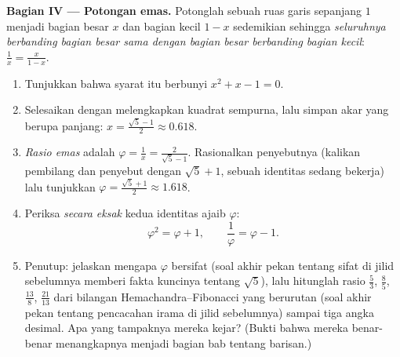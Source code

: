 \begin{problem}[{Soal akhir pekan --- soal jumlah-dan-hasil-kali,
melengkapkan kuadrat sempurna sebagaimana digambar al-Khwarizmi, dan
persamaan $x^2 = x + 1$}]
\medskip
\noindent\textbf{Bagian IV --- Potongan emas.}
Potonglah sebuah ruas garis sepanjang $1$ menjadi bagian besar $x$ dan
bagian kecil $1 - x$ sedemikian sehingga
\emph{seluruhnya berbanding bagian besar sama dengan bagian besar berbanding bagian kecil}:
$\frac{1}{x} = \frac{x}{1 - x}$.
\begin{enumerate}[resume]
  \item Tunjukkan bahwa syarat itu berbunyi $x^2 + x - 1 = 0$.
  \item Selesaikan dengan melengkapkan kuadrat sempurna, lalu simpan akar
        yang berupa panjang: $x = \frac{\sqrt5 - 1}{2} \approx 0.618$.
  \item \emph{Rasio emas} adalah
        $\varphi = \frac1x = \frac{2}{\sqrt5 - 1}$. Rasionalkan
        penyebutnya (kalikan pembilang dan penyebut dengan
        $\sqrt5 + 1$, sebuah identitas sedang bekerja) lalu tunjukkan
        $\varphi = \frac{\sqrt5 + 1}{2} \approx 1.618$.
  \item Periksa \emph{secara eksak} kedua identitas ajaib
        $\varphi$:
        \[
        \varphi^2 = \varphi + 1,
        \qquad
        \frac{1}{\varphi} = \varphi - 1 .
        \]
  \item Penutup: jelaskan mengapa $\varphi$ bersifat 
        (soal akhir pekan tentang sifat  di jilid sebelumnya
        memberi fakta kuncinya tentang $\sqrt5$), lalu hitunglah rasio
        $\frac53$, $\frac85$, $\frac{13}{8}$, $\frac{21}{13}$ dari
        bilangan Hemachandra--Fibonacci yang berurutan (soal akhir pekan
        tentang pencacahan irama di jilid sebelumnya) sampai tiga angka
        desimal. Apa yang tampaknya mereka kejar? (Bukti bahwa mereka
        benar-benar menangkapnya menjadi bagian bab tentang barisan.)

\end{enumerate}
\end{problem}
